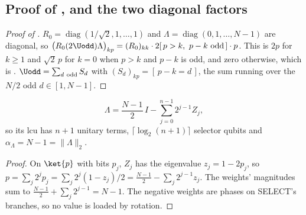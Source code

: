 %

\subsection{Proof of \texorpdfstring{}{the factorisation}, and the two diagonal factors}
\label{app:proof-G-factorisation}

\begin{proof}[Proof of ]
$R_0=\operatorname{diag}(1/\sqrt2,1,\dots,1)$ and $\Lambda=\operatorname{diag}(0,1,\dots,N-1)$ are diagonal, so $\bigl(R_0(2\Uodd)\Lambda\bigr)_{kp}=(R_0)_{kk}\cdot2[\,p>k,\ p-k\ \text{odd}\,]\cdot p$. This is $2p$ for $k\ge1$ and $\sqrt2\,p$ for $k=0$ when $p>k$ and $p-k$ is odd, and zero otherwise, which is . $\Uodd=\sum_{d\ \text{odd}}S_d$ with $(S_d)_{kp}=[\,p-k=d\,]$, the sum running over the $N/2$ odd $d\in[1,N-1]$.
\end{proof}

\begin{lemma}
\begin{equation}
    \Lambda = \frac{N-1}{2}\,I - \sum_{j=0}^{n-1} 2^{j-1} Z_j ,
    \label{eq:lambda-lcu}
\end{equation}
so its \gls{lcu} has $n+1$ unitary terms, $\lceil\log_2(n+1)\rceil$ selector qubits and $\alpha_\Lambda=N-1=\|\Lambda\|_2$.
\end{lemma}
\begin{proof}
On $\ket{p}$ with bits $p_j$, $Z_j$ has the eigenvalue $z_j=1-2p_j$, so $p=\sum_j2^jp_j=\sum_j2^j(1-z_j)/2=\tfrac{N-1}{2}-\sum_j2^{j-1}z_j$. The weights' magnitudes sum to $\tfrac{N-1}{2}+\sum_j2^{j-1}=N-1$. The negative weights are phases on SELECT's branches, so no value is loaded by rotation.
\end{proof}

